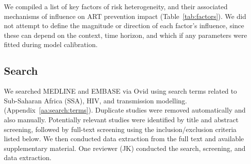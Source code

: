 We compiled a list of key factors of risk heterogeneity,   %
and their associated mechanisms of influence on ART prevention impact (Table~\ref{tab:factors}).
We did not attempt to define the magnitude or direction of each factor's influence,
since these can depend on the context, time horizon,
and which if any parameters were fitted during model calibration.\cite{Eaton2014}
\subsection{Search}
\label{ss:meth:search}
We searched MEDLINE and EMBASE via Ovid
using search terms related to Sub-Saharan Africa (SSA), HIV, and transmission modelling. %
(Appendix~\ref{aa:search:terms}).
Duplicate studies were removed automatically %
and also manually. %
Potentially relevant studies were identified by title and abstract screening, followed 
by full-text screening using the inclusion/exclusion criteria listed below. 
We then conducted data extraction from the full text and available supplementary material.
One reviewer (JK) conducted the search, screening, and data extraction.  
